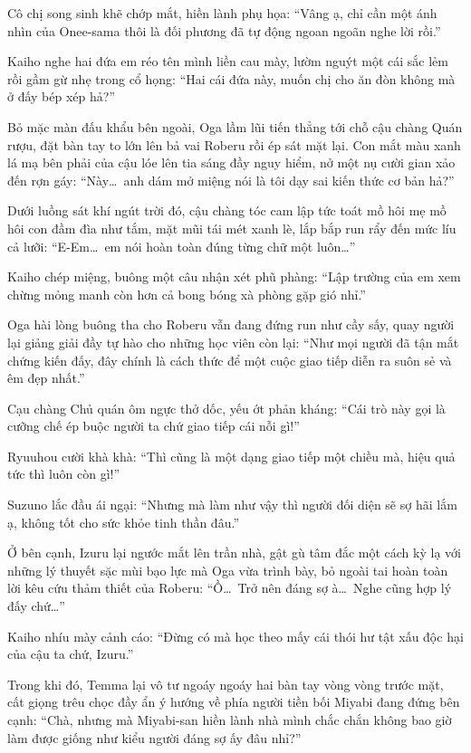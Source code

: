 \documentclass[../main.tex]{subfiles}
\begin{document}
Cô chị song sinh khẽ chớp mắt, hiền lành phụ họa: ``Vâng ạ, chỉ cần một ánh nhìn của Onee-sama thôi là đối phương đã tự động ngoan ngoãn nghe lời rồi.''

Kaiho nghe hai đứa em réo tên mình liền cau mày, lườm nguýt một cái sắc lẻm rồi gầm gừ nhẹ trong cổ họng: ``Hai cái đứa này, muốn chị cho ăn đòn không mà ở đấy bép xép hả?''

Bỏ mặc màn đấu khẩu bên ngoài, Oga lầm lũi tiến thẳng tới chỗ cậu chàng Quán rượu, đặt bàn tay to lớn lên bả vai Roberu rồi ép sát mặt lại. Con mắt màu xanh lá mạ bên phải của cậu lóe lên tia sáng đầy nguy hiểm, nở một nụ cười gian xảo đến rợn gáy: ``Này\dots\ anh dám mở miệng nói là tôi dạy sai kiến thức cơ bản hả?''

Dưới luồng sát khí ngút trời đó, cậu chàng tóc cam lập tức toát mồ hôi mẹ mồ hôi con đầm đìa như tắm, mặt mũi tái mét xanh lè, lắp bắp run rẩy đến mức líu cả lưỡi: ``E-Em\dots\ em nói hoàn toàn đúng từng chữ một luôn\dots''

Kaiho chép miệng, buông một câu nhận xét phũ phàng: ``Lập trường của em xem chừng mỏng manh còn hơn cả bong bóng xà phòng gặp gió nhỉ.''

Oga hài lòng buông tha cho Roberu vẫn đang đứng run như cầy sấy, quay người lại giảng giải đầy tự hào cho những học viên còn lại: ``Như mọi người đã tận mắt chứng kiến đấy, đây chính là cách thức để một cuộc giao tiếp diễn ra suôn sẻ và êm đẹp nhất.''

Cạu chàng Chủ quán ôm ngực thở dốc, yếu ớt phản kháng: ``Cái trò này gọi là cưỡng chế ép buộc người ta chứ giao tiếp cái nỗi gì!''

Ryuuhou cười khà khà: ``Thì cũng là một dạng giao tiếp một chiều mà, hiệu quả tức thì luôn còn gì!''

Suzuno lắc đầu ái ngại: ``Nhưng mà làm như vậy thì người đối diện sẽ sợ hãi lắm ạ, không tốt cho sức khỏe tinh thần đâu.''

Ở bên cạnh, Izuru lại ngước mắt lên trần nhà, gật gù tâm đắc một cách kỳ lạ với những lý thuyết sặc mùi bạo lực mà Oga vừa trình bày, bỏ ngoài tai hoàn toàn lời kêu cứu thảm thiết của Roberu: ``Ồ\dots\ Trở nên đáng sợ à\dots\ Nghe cũng hợp lý đấy chứ\dots''

Kaiho nhíu mày cảnh cáo: ``Đừng có mà học theo mấy cái thói hư tật xấu độc hại của cậu ta chứ, Izuru.''

Trong khi đó, Temma lại vô tư ngoáy ngoáy hai bàn tay vòng vòng trước mặt, cất giọng trêu chọc đầy ẩn ý hướng về phía người tiền bối Miyabi đang đứng bên cạnh: ``Chà, nhưng mà Miyabi-san hiền lành nhà mình chắc chắn không bao giờ làm được giống như kiểu người đáng sợ ấy đâu nhỉ?''
\end{document}
